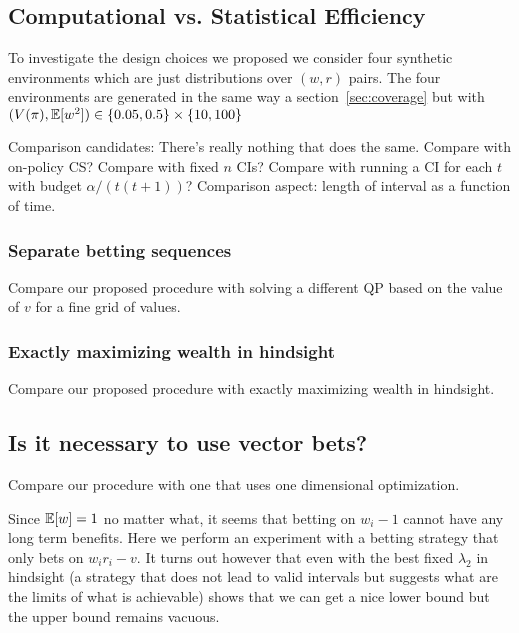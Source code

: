 \subsection{Computational vs. Statistical Efficiency}
To investigate the design choices we proposed we consider
four synthetic environments which are just 
distributions over $(w,r)$ pairs. The four environments
are generated in the same way a section~\ref{sec:coverage}
but with $(V(\pi),\mathbb{E}[w^2]) \in \{0.05, 0.5\} \times \{10, 100\}$

Comparison candidates: There's really nothing that does 
the same. Compare with on-policy CS? 
Compare with fixed $n$ CIs?
Compare with running a CI for each $t$ with budget 
$\alpha/(t(t+1))$?
Comparison aspect: length of interval as a function of time.
\subsubsection{Separate betting sequences}
Compare our proposed procedure with solving a different QP based on 
the value of $v$ for a fine grid of values.
\subsubsection{Exactly maximizing wealth in hindsight}
Compare our proposed procedure with exactly maximizing wealth in hindsight.
\subsection{Is it necessary to use vector bets?}
Compare our procedure with one that uses one dimensional optimization.

Since $\mathbb{E}[w]=1$ no matter what, it seems that betting  on $w_i-1$ 
cannot have any long term benefits. Here we perform an experiment with a 
betting strategy that only bets on $w_i r_i -v$. It turns out however that
even with the best fixed $\lambda_2$ in hindsight (a strategy that does not lead 
to valid intervals but suggests what are the limits of what is achievable) 
shows that we can get a nice lower bound but the upper bound remains vacuous. 

